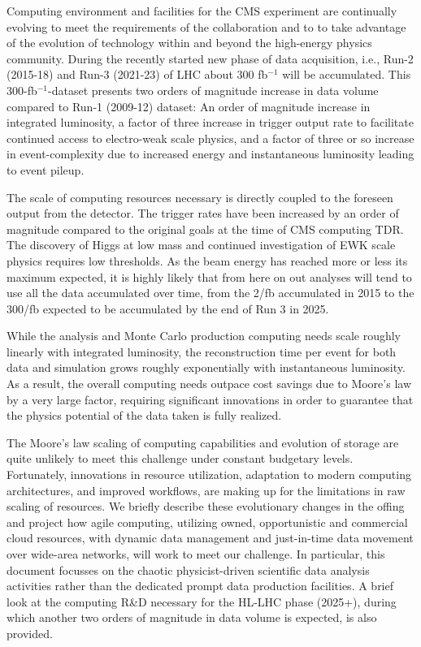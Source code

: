 \documentclass[11pt,a4paper]{article}
\begin{document}
Computing environment and facilities for the CMS experiment are
continually evolving to meet the requirements of the collaboration and
to to take advantage of the evolution of technology within and beyond
the high-energy physics community. During the recently started new
phase of data acquisition, i.e., Run-2 (2015-18) and Run-3 (2021-23)
of LHC about 300 fb$^{-1}$ will be accumulated. This
300-fb$^{-1}$-dataset presents two orders of magnitude increase in
data volume compared to Run-1 (2009-12) dataset: An order of magnitude
increase in integrated luminosity, a factor of three increase in
trigger output rate to facilitate continued access to electro-weak
scale physics, and a factor of three or so increase in
event-complexity due to increased energy and instantaneous luminosity
leading to event pileup.

The scale of computing resources necessary is directly coupled to the
foreseen output from the detector.  The trigger rates have been
increased by an order of magnitude compared to the original goals at
the time of CMS computing TDR. The discovery of Higgs at low mass and
continued investigation of EWK scale physics requires low thresholds.
As the beam energy has reached more or less its maximum expected, it
is highly likely that from here on out analyses will tend to use all
the data accumulated over time, from the 2/fb accumulated in 2015 to
the 300/fb expected to be accumulated by the end of Run 3 in 2025.

While the analysis and Monte Carlo production computing needs scale
roughly linearly with integrated luminosity, the reconstruction time
per event for both data and simulation grows roughly exponentially
with instantaneous luminosity.  As a result, the overall computing
needs outpace cost savings due to Moore's law by a very large factor,
requiring significant innovations in order to guarantee that the
physics potential of the data taken is fully realized.

The Moore's law scaling of computing capabilities and evolution of
storage are quite unlikely to meet this challenge under constant
budgetary levels. Fortunately, innovations in resource utilization,
adaptation to modern computing architectures, and improved workflows,
are making up for the limitations in raw scaling of resources. We
briefly describe these evolutionary changes in the offing and project
how agile computing, utilizing owned, opportunistic and commercial
cloud resources, with dynamic data management and just-in-time data
movement over wide-area networks, will work to meet our challenge. In
particular, this document focusses on the chaotic physicist-driven
scientific data analysis activities rather than the dedicated prompt
data production facilities. A brief look at the computing R\&D
necessary for the HL-LHC phase (2025+), during which another two
orders of magnitude in data volume is expected, is also provided.
\end{document}
